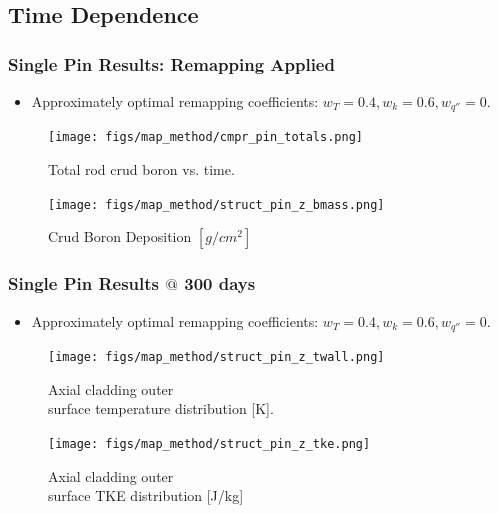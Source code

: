 \documentclass[t, pdftex]{beamer}
\begin{document}
\subsection*{Time Dependence}
\begin{frame}
\frametitle{Single Pin Results:  Remapping Applied}
\begin{itemize}
    \item Approximately optimal remapping coefficients: $w_T=0.4, w_k=0.6, w_{q''}=0$. 
\end{itemize}
    \begin{figure}
        \centering
        \begin{minipage}{.5\textwidth}
            \centering
            \texttt{[image: figs/map\_method/cmpr\_pin\_totals.png]}
            \caption{\centering Total rod crud boron vs. time.}
        \end{minipage}%
        \begin{minipage}{.5\textwidth}
            \centering
            \texttt{[image: figs/map\_method/struct\_pin\_z\_bmass.png]}
            \caption{ \centering Crud Boron Deposition $[g/cm^2]$}
        \end{minipage}
    \end{figure} 
\end{frame}

\begin{frame}
\frametitle{Single Pin Results $@$ 300 days}
\begin{itemize}
    \item Approximately optimal remapping coefficients: $w_T=0.4, w_k=0.6, w_{q''}=0$. 
\end{itemize}
    \begin{figure}
        \centering
        \begin{minipage}{.5\textwidth}
            \centering
            \texttt{[image: figs/map\_method/struct\_pin\_z\_twall.png]}
            \caption{\centering Axial cladding outer \\ surface temperature distribution [K].}
        \end{minipage}%
        \begin{minipage}{.5\textwidth}
            \centering
            \texttt{[image: figs/map\_method/struct\_pin\_z\_tke.png]}
            \caption{ \centering Axial cladding outer \\ surface TKE distribution [J/kg]}
        \end{minipage}
    \end{figure}
\end{frame}
\end{document}
